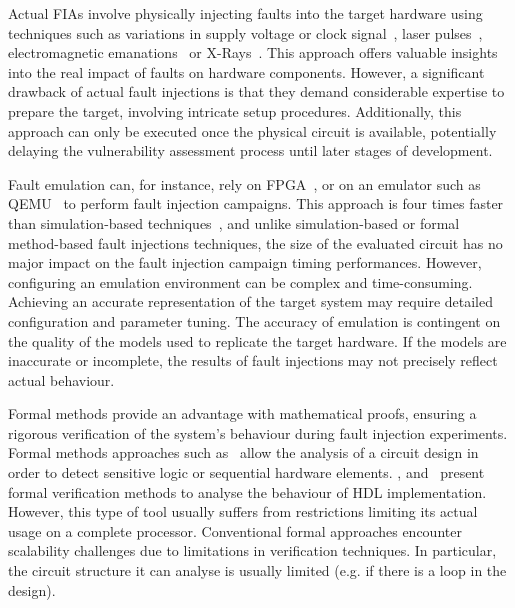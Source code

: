 Actual FIAs involve physically injecting faults into the target hardware using techniques such as variations in supply voltage or clock signal~\cite{BCNTW-06-procieee, BFP-19-tches}, laser pulses~\cite{BCNTW-06-procieee, CGVCBLC-22-cardis}, electromagnetic emanations~\cite{BCNTW-06-procieee} or X-Rays~\cite{GBD-23-paine}.
This approach offers valuable insights into the real impact of faults on hardware components.
However, a significant drawback of actual fault injections is that they demand considerable expertise to prepare the target, involving intricate setup procedures.
Additionally, this approach can only be executed once the physical circuit is available, potentially delaying the vulnerability assessment process until later stages of development.

Fault emulation can, for instance, rely on FPGA~\cite{CMLCVR-11-crypto}, or on an emulator such as QEMU~\cite{HGASO-21-fdtc,BLK-23-access} to perform fault injection campaigns. This approach is four times faster than simulation-based techniques~\cite{NNHRS-14-dsd}, and unlike simulation-based or formal method-based fault injections techniques, the size of the evaluated circuit has no major impact on the fault injection campaign timing performances.
However, configuring an emulation environment can be complex and time-consuming. Achieving an accurate representation of the target system may require detailed configuration and parameter tuning. The accuracy of emulation is contingent on the quality of the models used to replicate the target hardware. If the models are inaccurate or incomplete, the results of fault injections may not precisely reflect actual behaviour.

Formal methods provide an advantage with mathematical proofs, ensuring a rigorous verification of the system's behaviour during fault injection experiments. Formal methods approaches such as~\cite{BSSMG-21-tches} allow the analysis of a circuit design in order to detect sensitive logic or sequential hardware elements. \cite{ANR-18-ices}, \cite{BBCFGS-19-esorics} and~\cite{SVPMRDKMS-24-eprint} present formal verification methods to analyse the behaviour of HDL implementation.
However, this type of tool usually suffers from restrictions limiting its actual usage on a complete processor.
Conventional formal approaches encounter scalability challenges due to limitations in verification techniques.
In particular, the circuit structure it can analyse is usually limited (e.g. if there is a loop in the design).

